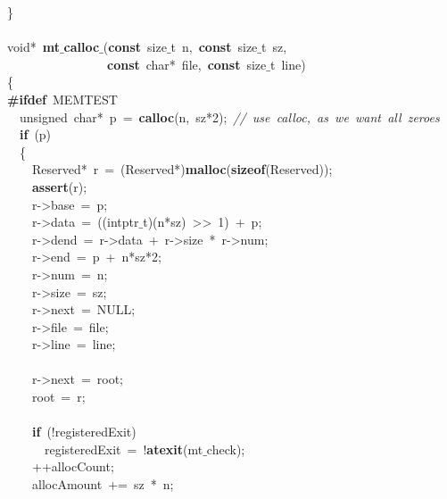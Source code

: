 \documentclass{article}
\begin{document}
\mbox{}\} \\
\mbox{} \\
\mbox{}void*\ \textbf{mt$\_$calloc$\_$}(\textbf{const}\ size$\_$t\ n,\ \textbf{const}\ size$\_$t\ sz, \\
\mbox{}\ \ \ \ \ \ \ \ \ \ \ \ \ \ \ \ \textbf{const}\ char*\ file,\ \textbf{const}\ size$\_$t\ line) \\
\mbox{}\{ \\
\mbox{}\textbf{\#ifdef}\ MEMTEST \\
\mbox{}\ \ unsigned\ char*\ p\ =\ \textbf{calloc}(n,\ sz*2);\ \textit{//\ use\ calloc,\ as\ we\ want\ all\ zeroes} \\
\mbox{}\ \ \textbf{if}\ (p) \\
\mbox{}\ \ \{ \\
\mbox{}\ \ \ \ Reserved*\ r\ =\ (Reserved*)\textbf{malloc}(\textbf{sizeof}(Reserved)); \\
\mbox{}\ \ \ \ \textbf{assert}(r); \\
\mbox{}\ \ \ \ r-\textgreater{}base\ =\ p; \\
\mbox{}\ \ \ \ r-\textgreater{}data\ =\ ((intptr$\_$t)(n*sz)\ \textgreater{}\textgreater{}\ 1)\ +\ p; \\
\mbox{}\ \ \ \ r-\textgreater{}dend\ =\ r-\textgreater{}data\ +\ r-\textgreater{}size\ *\ r-\textgreater{}num; \\
\mbox{}\ \ \ \ r-\textgreater{}end\ =\ p\ +\ n*sz*2; \\
\mbox{}\ \ \ \ r-\textgreater{}num\ =\ n; \\
\mbox{}\ \ \ \ r-\textgreater{}size\ =\ sz; \\
\mbox{}\ \ \ \ r-\textgreater{}next\ =\ NULL; \\
\mbox{}\ \ \ \ r-\textgreater{}file\ =\ file; \\
\mbox{}\ \ \ \ r-\textgreater{}line\ =\ line; \\
\mbox{} \\
\mbox{}\ \ \ \ r-\textgreater{}next\ =\ root; \\
\mbox{}\ \ \ \ root\ =\ r; \\
\mbox{} \\
\mbox{}\ \ \ \ \textbf{if}\ (!registeredExit) \\
\mbox{}\ \ \ \ \ \ registeredExit\ =\ !\textbf{atexit}(mt$\_$check); \\
\mbox{}\ \ \ \ ++allocCount; \\
\mbox{}\ \ \ \ allocAmount\ +=\ sz\ *\ n; \\
\mbox{} \\
\end{document}

